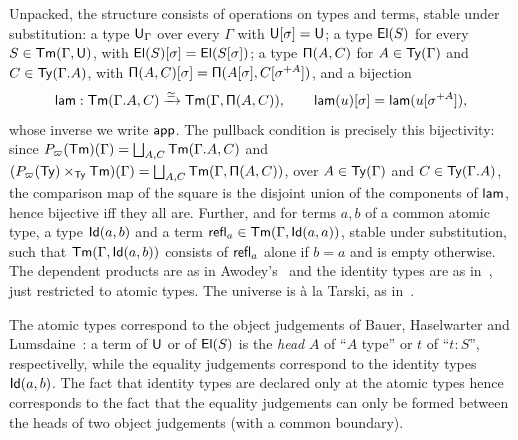 Unpacked, the structure consists of operations on types and terms, stable under substitution: a type $\mathsf{U}_\Gamma$ over every $\Gamma$ with $\mathsf{U}[\sigma] = \mathsf{U}$; a type $\mathsf{El}(S)$ for every $S \in \mathsf{Tm}(\Gamma, \mathsf{U})$, with $\mathsf{El}(S)[\sigma] = \mathsf{El}(S[\sigma])$; a type $\mathsf{\Pi}(A, C)$ for $A \in \mathsf{Ty}(\Gamma)$ and $C \in \mathsf{Ty}(\Gamma.A)$, with $\mathsf{\Pi}(A, C)[\sigma] = \mathsf{\Pi}(A[\sigma], C[\sigma^{+A}])$, and a bijection
\[
    \mathsf{lam} : \mathsf{Tm}(\Gamma.A, C) \xrightarrow{\simeq} \mathsf{Tm}(\Gamma, \mathsf{\Pi}(A, C)), \qquad \mathsf{lam}(u)[\sigma] = \mathsf{lam}(u[\sigma^{+A}]),
\]
whose inverse we write $\mathsf{app}$. The pullback condition is precisely this bijectivity: since $P_\varpi(\mathsf{Tm})(\Gamma) = \bigsqcup_{A, C} \mathsf{Tm}(\Gamma.A, C)$ and $(P_\varpi(\mathsf{Ty}) \times_{\mathsf{Ty}} \mathsf{Tm})(\Gamma) = \bigsqcup_{A, C} \mathsf{Tm}(\Gamma, \mathsf{\Pi}(A, C))$, over $A \in \mathsf{Ty}(\Gamma)$ and $C \in \mathsf{Ty}(\Gamma.A)$, the comparison map of the square is the disjoint union of the components of $\mathsf{lam}$, hence bijective iff they all are. Further, and for terms $a, b$ of a common atomic type, a type $\mathsf{Id}(a, b)$ and a term $\mathsf{refl}_a \in \mathsf{Tm}(\Gamma, \mathsf{Id}(a, a))$, stable under substitution, such that $\mathsf{Tm}(\Gamma, \mathsf{Id}(a, b))$ consists of $\mathsf{refl}_a$ alone if $b = a$ and is empty otherwise. The dependent products are as in Awodey's~\cite[Prop.~8]{Awodey2018} and the identity types are as in~\cite[Prop.~15]{Awodey2018}, just restricted to atomic types. The universe is à la Tarski, as in~\cite[Ex.~5.10]{Uemura2023}.

\begin{remark}\label{rem:atoms}
    The atomic types correspond to the object judgements of Bauer, Haselwarter and Lumsdaine~\cite[\S4.2]{BauerHaselwarterLumsdaine2020}: a term of $\mathsf{U}$ or of $\mathsf{El}(S)$ is the \emph{head} $A$ of \enquote{$A$ type} or $t$ of \enquote{$t : S$}, respectivelly, while the equality judgements correspond to the identity types $\mathsf{Id}(a,b)$. The fact that identity types are declared only at the atomic types hence corresponds to the fact that the equality judgements can only be formed between the heads of two object judgements (with a common boundary).
\end{remark}

